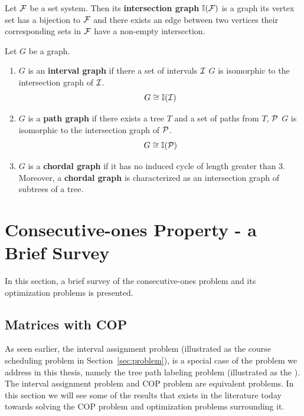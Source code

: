 
\begin{definition}
  \label{def:intersectiongraph}
  Let ${\cal F}$ be a set system. Then its \textbf{intersection graph}
  $\mathbb I({\cal F})$ is a graph \stt its vertex set has a bijection to ${\cal F}$
  and there exists an edge between two vertices \iff their
  corresponding sets in ${\cal F}$ have a non-empty intersection.
\end{definition}

\begin{definition}
  \label{def:pathgraph}
  Let $G$ be a graph.
  \begin{enumerate}
  \hangindent {}
  \item $G$ is an \textbf{interval graph} if there a set of intervals
    ${\cal I}$ \stt $G$ is isomorphic to the intersection graph of
    ${\cal I}$. \[G \cong \mathbb I({\cal I})\]
  \item $G$ is a \textbf{path graph} if there exists a tree $T$ and a
    set of paths from $T$, ${\cal P}$ \stt $G$ is isomorphic to the
    intersection graph of ${\cal P}$. \[G \cong \mathbb I({\cal P})\]
  \item $G$ is a \textbf{chordal graph} if it has no induced cycle of
    length greater than 3. Moreover, a \textbf{chordal graph} is
    characterized as an intersection graph of subtrees of a tree.
  \end{enumerate}
\end{definition}



\section[Brief Survey]{Consecutive-ones Property - a Brief Survey}
\label{sec:background}

In this section, a brief survey of the consecutive-ones problem and
its optimization problems is presented.


\subsection{Matrices with COP}
\label{sec:copmatrices}
As seen earlier, the interval assignment problem (illustrated as the
course scheduling problem in Section~\ref{sec:problem}), is a special
case of the problem we address in this thesis, namely the tree path
labeling problem (illustrated as the \illustrationproblem). The
interval assignment problem and COP problem are equivalent
problems. In this section we will see some of the results that exists
in the literature today towards solving the COP problem and
optimization problems surrounding it.


